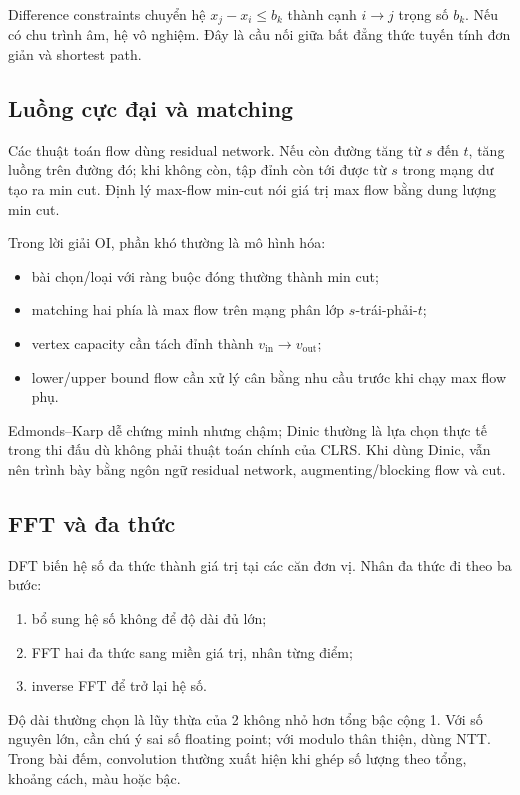 \documentclass[11pt]{article}
\begin{document}
Difference constraints chuyển hệ \(x_j-x_i\le b_k\) thành cạnh \(i\to j\) trọng
số \(b_k\). Nếu có chu trình âm, hệ vô nghiệm. Đây là cầu nối giữa bất đẳng thức
tuyến tính đơn giản và shortest path.

\subsection{Luồng cực đại và matching}

Các thuật toán flow dùng residual network. Nếu còn đường tăng từ \(s\) đến
\(t\), tăng luồng trên đường đó; khi không còn, tập đỉnh còn tới được từ \(s\)
trong mạng dư tạo ra min cut. Định lý max-flow min-cut nói giá trị max flow bằng
dung lượng min cut.

Trong lời giải OI, phần khó thường là mô hình hóa:
\begin{itemize}
  \item bài chọn/loại với ràng buộc đóng thường thành min cut;
  \item matching hai phía là max flow trên mạng phân lớp \(s\)-trái-phải-\(t\);
  \item vertex capacity cần tách đỉnh thành \(v_{\mathrm{in}}\to v_{\mathrm{out}}\);
  \item lower/upper bound flow cần xử lý cân bằng nhu cầu trước khi chạy max
        flow phụ.
\end{itemize}
Edmonds--Karp dễ chứng minh nhưng chậm; Dinic thường là lựa chọn thực tế trong
thi đấu dù không phải thuật toán chính của CLRS. Khi dùng Dinic, vẫn nên trình
bày bằng ngôn ngữ residual network, augmenting/blocking flow và cut.

\subsection{FFT và đa thức}

DFT biến hệ số đa thức thành giá trị tại các căn đơn vị. Nhân đa thức đi theo
ba bước:
\begin{enumerate}
  \item bổ sung hệ số không để độ dài đủ lớn;
  \item FFT hai đa thức sang miền giá trị, nhân từng điểm;
  \item inverse FFT để trở lại hệ số.
\end{enumerate}
Độ dài thường chọn là lũy thừa của 2 không nhỏ hơn tổng bậc cộng 1. Với số
nguyên lớn, cần chú ý sai số floating point; với modulo thân thiện, dùng NTT.
Trong bài đếm, convolution thường xuất hiện khi ghép số lượng theo tổng, khoảng
cách, màu hoặc bậc.
\end{document}
